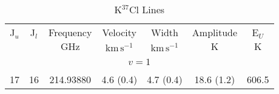 \begin{table*}[htp]
\centering
\caption{K$^{37}$Cl Lines}
\begin{tabular}{ccccccc}
\label{tab:K37Cl_salt_lines}
 J$_u$ & J$_l$ & Frequency & Velocity & Width & Amplitude & E$_U$ \\
  &  & $\mathrm{GHz}$ & $\mathrm{km\,s^{-1}}$ & $\mathrm{km\,s^{-1}}$ & $\mathrm{K}$ & $\mathrm{K}$ \\
\hline
&\vspace{-0.75em}\\
\multicolumn{7}{c}{$v = 1$} \\
\vspace{-0.75em}\\
 17 & 16 & 214.93880 & 4.6 (0.4) & 4.7 (0.4) & 18.6 (1.2) & 606.5 \\
\hline
\end{tabular}

\par 
\end{table*}
